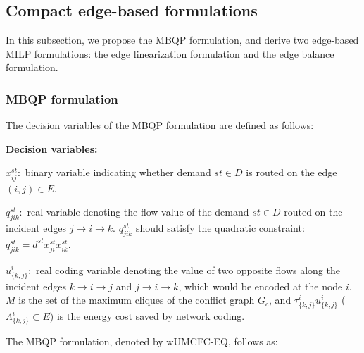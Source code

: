 \subsection{Compact edge-based formulations}
In this subsection, we propose the MBQP formulation, and derive two edge-based MILP formulations: the edge linearization formulation and the edge balance formulation. 

\subsubsection{MBQP formulation}

The decision variables of the MBQP formulation are defined as follows:


\textbf{Decision variables:}

\(x^{st}_{ij}: \) binary variable indicating whether demand \(st \in D\) is routed on the edge \((i,j) \in E\).

\(q^{st}_{jik}:\) real variable denoting the flow value of the demand \(st \in D\) routed on the incident edges \(j \to i \to k\). \(q^{st}_{jik}\) should satisfy the quadratic constraint: \(q^{st}_{jik} = d^{st} x^{st}_{ji}  x^{st}_{ik}\).

\(u^i_{\{k,j\}}:\) real coding variable denoting the value of two opposite flows along the incident edges \(k \to i \to j\) and \(j \to i \to k\), which would be encoded at the node \(i\). \\


\(M\) is the set of the maximum cliques of the conflict graph \(G_c\), and \(\tau^i_{\{k,j\}}u^i_{\{k,j\}}\) (\(\Lambda^i_{\{k,j\}} \subset E\)) is the energy cost saved by network coding.

The MBQP formulation, denoted by wUMCFC-EQ, follows as:


